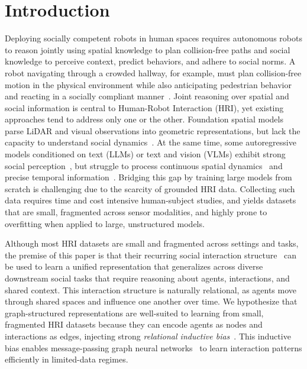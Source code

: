 \documentclass{article}
\begin{document}
\section{Introduction}
Deploying socially competent robots in human spaces requires autonomous robots to reason jointly using spatial knowledge to plan collision-free paths and social knowledge to perceive context, predict behaviors, and adhere to social norms. A robot navigating through a crowded hallway, for example, must plan collision-free motion in the physical environment while also anticipating pedestrian behavior and reacting in a socially compliant manner~\cite{mavrogiannis2023core, francis2025principles}.
Joint reasoning over spatial and social information is central to Human-Robot Interaction (HRI), yet existing approaches tend to address only one or the other.
Foundation spatial models parse LiDAR and visual observations into geometric representations, but lack the capacity to understand social dynamics~\cite{zhou2025social, lisondra2026embodied}.
At the same time, some autoregressive models conditioned on text (LLMs) or text and vision (VLMs) exhibit strong social perception~\cite{zhou2025social}, but struggle to process continuous spatial dynamics~\cite{ramakrishnan2024does, munje2025socialnavsub} and precise temporal information~\cite{gao2025vision}.
Bridging this gap by training large models from scratch is challenging due to the scarcity of grounded HRI data.
Collecting such data requires time and cost intensive human-subject studies, and yields datasets that are small, fragmented across sensor modalities, and highly prone to overfitting when applied to large, unstructured models.

Although most HRI datasets are small and fragmented across settings and tasks, the premise of this paper is that their recurring social interaction structure~\cite{de2015makes} can be used to learn a unified representation that generalizes across diverse downstream social tasks that require reasoning about agents, interactions, and shared context. This interaction structure is naturally relational, as agents move through shared spaces and influence one another over time. We hypothesize that graph-structured representations are well-suited to learning from small, fragmented HRI datasets because they can encode agents as nodes and interactions as edges, injecting strong \textit{relational inductive bias}~\cite{battaglia2018relational}. This inductive bias enables message-passing graph neural networks~\cite{gilmer2020message} to learn interaction patterns efficiently in limited-data regimes.
\end{document}
